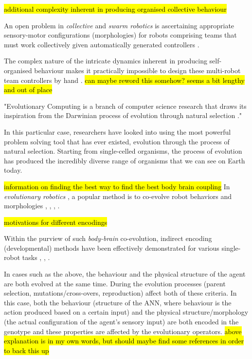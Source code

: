 \hl{additional complexity inherent in producing organised collective behaviour}

An open problem in \textit{collective} \cite{KubeZhang1994B} and \textit{swarm robotics} \cite{Beni2004}
is ascertaining appropriate sensory-motor configurations (morphologies) for robots comprising teams that must work collectively given automatically generated controllers \cite{FloreanoDurrMattiussi2008}.

The complex nature of the intricate dynamics inherent in producing self-organised behaviour makes it practically impossible to design these multi-robot team controllers by hand \cite{RefWorks:11}. \hl{can maybe reword this somehow? seems a bit lengthy and out of place}

"Evolutionary Computing is a branch of computer science research  that draws its inspiration from the Darwinian process of evolution through natural selection \cite{EibenSmith2003}."


In this particular case, researchers have looked into using the most powerful problem solving tool that has ever existed, evolution through the process of natural selection. Starting from single-celled organisms, the process of evolution has produced the incredibly diverse range of organisms that we can see on Earth today.

\hl{information on finding the best way to find the best body brain coupling}
In \textit{evolutionary robotics} \cite{DoncieuxBredecheMouretEiben2015},
a popular method is to co-evolve robot behaviors and morphologies
\cite{LipsonPollack2000}, \cite{Lund2003}, \cite{BuasonBergfeldtZiemke2005}, \cite{AuerbachBongard2014}.


\hl{motivations for different encodings}

Within the purview of such \textit{body-brain} co-evolution, indirect encoding (developmental) methods
have been effectively demonstrated for various single-robot tasks \cite{MautnerBelew2000},
\cite{HornbyPollack2002}, \cite{CheneyLipson2013}.

In cases such as the above, the behaviour and the physical structure of the agent are both evolved at the same time. During the evolution processes (parent selection, mutations/cross-overs, reproduction) affect both of these criteria. In this case, both the behaviour (structure of the ANN, where behaviour is the action produced based on a certain input) and the physical structure/morphology (the actual configuration of the agent's sensory input) are both encoded in the genotype and these properties are affected by the evolutionary operators.
\hl{above explanation is in my own words, but should maybe find some references in order to back this up}





